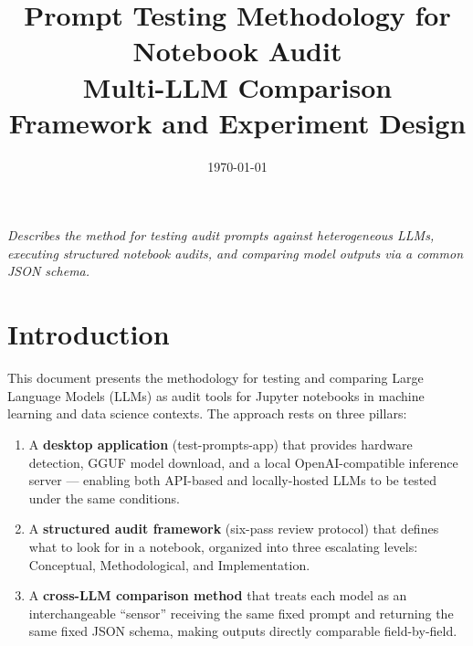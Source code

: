 \documentclass[11pt, a4paper]{article}
\begin{document}
\title{\textbf{Prompt Testing Methodology for Notebook Audit}\\[4pt]
       \large Multi-LLM Comparison Framework and Experiment Design}

\author{}
\date{\today}
\maketitle

\vspace{-12pt}

\begin{center}
\small
\textit{Describes the method for testing audit prompts against heterogeneous LLMs,}\\
\textit{executing structured notebook audits, and comparing model outputs via a common JSON schema.}
\end{center}

\vspace{18pt}

\section{Introduction}

This document presents the methodology for testing and comparing Large Language
Models (LLMs) as audit tools for Jupyter notebooks in machine learning and data
science contexts. The approach rests on three pillars:

\begin{enumerate}[leftmargin=*]
  \item A \textbf{desktop application} (test-prompts-app) that provides
        hardware detection, GGUF model download, and a local OpenAI-compatible
        inference server — enabling both API-based and locally-hosted LLMs to
        be tested under the same conditions.
  \item A \textbf{structured audit framework} (six-pass review protocol) that
        defines what to look for in a notebook, organized into three escalating
        levels: Conceptual, Methodological, and Implementation.
  \item A \textbf{cross-LLM comparison method} that treats each model as an
        interchangeable ``sensor'' receiving the same fixed prompt and returning
        the same fixed JSON schema, making outputs directly comparable
        field-by-field.
\end{enumerate}
\end{document}
